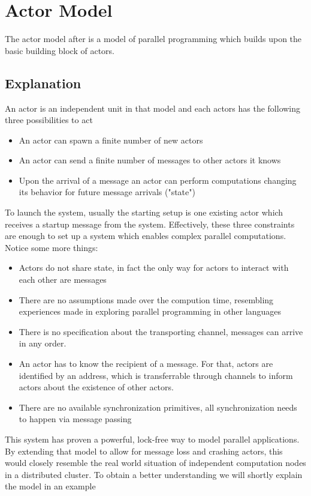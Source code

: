 \documentclass[]{paper}
\begin{document}
\section{Actor Model}
The actor model after \cite{Actormodel} is a model of parallel programming which builds upon the basic building block of actors.

\subsection{Explanation}
An actor is an independent unit in that model and each actors has the following three possibilities to act
\begin{itemize}
  \item An actor can spawn a finite number of new actors
  \item An actor can send a finite number of messages to other actors it knows
  \item Upon the arrival of a message an actor can perform computations changing its behavior for future message arrivals ("state")
\end{itemize}

To launch the system, usually the starting setup is one existing actor which receives a startup message from the system. Effectively, these three constraints are enough to set up a system which enables complex parallel computations. Notice some more things:

\begin{itemize}
  \item Actors do not share state, in fact the only way for actors to interact with each other are messages
  \item There are no assumptions made over the compution time, resembling experiences made in exploring parallel programming in other languages
  \item There is no specification about the transporting channel, messages can arrive in any order.
  \item An actor has to know the recipient of a message. For that, actors are identified by an address, which is transferrable through channels to inform actors about the existence of other actors.
  \item There are no available synchronization primitives, all synchronization needs to happen via message passing
\end{itemize}

This system has proven a powerful, lock-free way to model parallel applications. By extending that model to allow for message loss and crashing actors, this would closely resemble the real world situation of independent computation nodes in a distributed cluster. To obtain a better understanding we will shortly explain the model in an example
\end{document}
